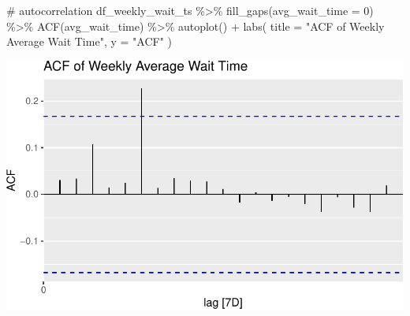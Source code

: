 \documentclass[
  letterpaper,
  DIV=11,
  numbers=noendperiod]{scrartcl}
\newenvironment{Shaded}{\begin{snugshade}}{\end{snugshade}}
\newcommand{\AttributeTok}[1]{\textcolor[rgb]{0.40,0.45,0.13}{#1}}
\newcommand{\CommentTok}[1]{\textcolor[rgb]{0.37,0.37,0.37}{#1}}
\newcommand{\DecValTok}[1]{\textcolor[rgb]{0.68,0.00,0.00}{#1}}
\newcommand{\FunctionTok}[1]{\textcolor[rgb]{0.28,0.35,0.67}{#1}}
\newcommand{\NormalTok}[1]{\textcolor[rgb]{0.00,0.23,0.31}{#1}}
\newcommand{\SpecialCharTok}[1]{\textcolor[rgb]{0.37,0.37,0.37}{#1}}
\newcommand{\StringTok}[1]{\textcolor[rgb]{0.13,0.47,0.30}{#1}}
\begin{document}
\begin{Shaded}
\begin{Highlighting}[]
\CommentTok{\# autocorrelation}
\NormalTok{df\_weekly\_wait\_ts }\SpecialCharTok{\%\textgreater{}\%}
  \FunctionTok{fill\_gaps}\NormalTok{(}\AttributeTok{avg\_wait\_time =} \DecValTok{0}\NormalTok{) }\SpecialCharTok{\%\textgreater{}\%}
  \FunctionTok{ACF}\NormalTok{(avg\_wait\_time) }\SpecialCharTok{\%\textgreater{}\%}
  \FunctionTok{autoplot}\NormalTok{() }\SpecialCharTok{+} 
  \FunctionTok{labs}\NormalTok{(}
    \AttributeTok{title =} \StringTok{"ACF of Weekly Average Wait Time"}\NormalTok{, }
    \AttributeTok{y =} \StringTok{"ACF"}
\NormalTok{  )}
\end{Highlighting}
\end{Shaded}

\includegraphics{final_proj_group1_files/figure-pdf/unnamed-chunk-3-2.pdf}
\end{document}

